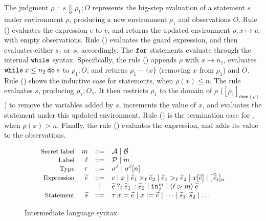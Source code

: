 The judgment $\rho \vdash s \Downarrow \rho_{1}; O$ represents the
big-step evaluation of a statement $s$ under environment $\rho$,
producing a new environment $\rho_{1}$ and observations $O$. Rule
({}) evaluates the expression $e$ to $v$, and returns the
updated environment $\rho,x \mapsto v$, with empty observations. Rule
({}) evaluates the guard expression, and then evaluates
either $s_{1}$ or $s_{2}$ accordingly. The ${\mathtt{for}}$ statements evaluate
through the internal ${\mathtt{while}}$ syntax. Specifically, the rule
({}) appends $\rho$ with $x\mapsto n_{1}$,
evaluates ${\mathtt{while}}\:{x} \leq {n_{2}}\:{\mathtt{do}}\:{s}$ to $\rho_{1}; O$, and returns
$\rho_{1} - \{x\}$ (removing $x$ from $\rho_{1}$) and $O$. Rule
({}) shows the inductive case for 
statements, when $\rho(x) \leq n$. The rule evaluates $s$, producing
$\rho_{1}; O_{1}$. It then restricts $\rho_{1}$ to the domain of
$\rho$ ($[\rho_{1}]_{\mathsf{dom}(\rho)}$) to remove the variables
added by $s$, increments the value of $x$, and evaluates the
 statement under this updated environment. Rule
({}) is the termination case for ,
when $\rho(x) > n$. Finally, the rule ({}) evaluates the
expression, and adds its value to the observations.

\newcommand{\lcond}[4]{\ensuremath{{{#2}\:?_{{#1}}\:{#3}\::{#4}}}}

\begin{figure}[htp]
  \footnotesize
  \[
  \begin{array}{rrcl}
    \ftext{Secret label} & m &::=& \mathcal{A} \mid \mathcal{B}\\
    \ftext{Label} & \ell &::=& \mathcal{P} \mid m\\
    \ftext{Type} & \tau &::=& \sigma^{\ell} \mid \sigma^{\ell}[n]\\
    \ftext{Expression} & \widetilde{e} &::=& c \mid x \mid \widetilde{e}_{1} \mulop_{\ell} \widetilde{e}_{2} \mid \widetilde{e}_{1} >_{\ell} \widetilde{e}_{2} \mid x[\widetilde{e}] \mid [\,\overline{\widetilde{e}}_{i}]_{n} \\
    & & \mid & \lcond{\ell}{{\widetilde{e}}}{{\widetilde{e}}_{1}}{{\widetilde{e}}_{2}} \mid \kw{in}^{m}_{j} \mid \langle \ell \rhd m \rangle\:\widetilde{e}\\
    \ftext{Statement} & \widetilde{s} &::=& \tau\:x = \widetilde{e} \mid x := \widetilde{e} \mid \dots \mid \widetilde{s}_{1}; \widetilde{s}_{2} \mid \dots\\
  \end{array}
  \]
\caption{Intermediate language syntax}
\label{fig:interlang}
\end{figure}

